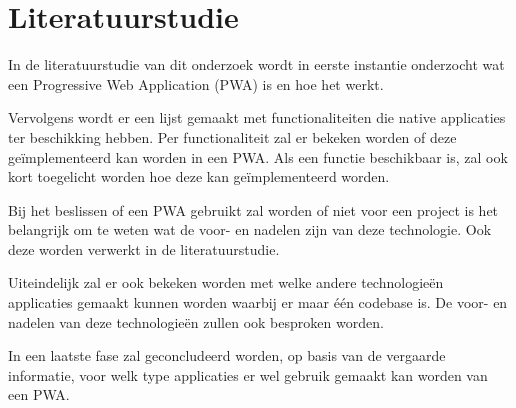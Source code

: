 \chapter{Literatuurstudie}
\label{ch:stand-van-zaken}



In de literatuurstudie van dit onderzoek wordt in eerste instantie onderzocht wat een Progressive Web Application (PWA) is en hoe het werkt.

Vervolgens wordt er een lijst gemaakt met functionaliteiten die native applicaties ter beschikking hebben. Per functionaliteit zal er bekeken worden of deze geïmplementeerd kan worden in een PWA. Als een functie beschikbaar is, zal ook kort toegelicht worden hoe deze kan geïmplementeerd worden.

Bij het beslissen of een PWA gebruikt zal worden of niet voor een project is het belangrijk om te weten wat de voor- en nadelen zijn van deze technologie. Ook deze worden verwerkt in de literatuurstudie.

Uiteindelijk zal er ook bekeken worden met welke andere technologieën applicaties gemaakt kunnen worden waarbij er maar één codebase is. De voor- en nadelen van deze technologieën zullen ook besproken worden.

In een laatste fase zal geconcludeerd worden, op basis van de vergaarde informatie, voor welk type applicaties er wel gebruik gemaakt kan worden van een PWA.












